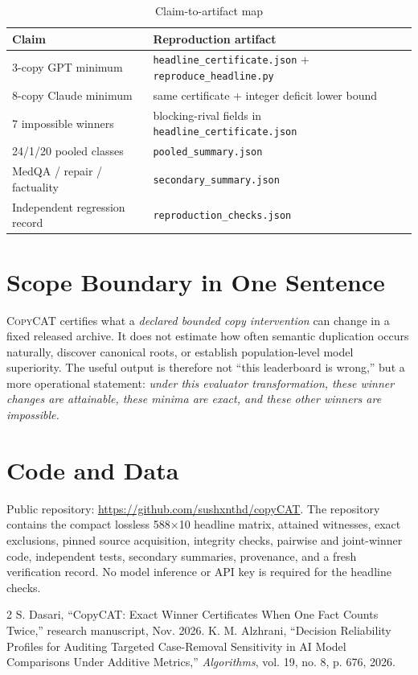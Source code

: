 \documentclass[conference]{IEEEtran}
\newcommand{\copycat}{\textsc{CopyCAT}}
\begin{document}
\begin{table}[H]
\caption{Claim-to-artifact map}
\label{tab:map}
\centering
\footnotesize
\begin{tabular}{p{}p{}}
\toprule
Claim & Reproduction artifact \\
\midrule
3-copy GPT minimum & \texttt{headline\_certificate.json} + \texttt{reproduce\_headline.py} \\
8-copy Claude minimum & same certificate + integer deficit lower bound \\
7 impossible winners & blocking-rival fields in \texttt{headline\_certificate.json} \\
24/1/20 pooled classes & \texttt{pooled\_summary.json} \\
MedQA / repair / factuality & \texttt{secondary\_summary.json} \\
Independent regression record & \texttt{reproduction\_checks.json} \\
\bottomrule
\end{tabular}
\end{table}

\section{Scope Boundary in One Sentence}
\copycat{} certifies what a \emph{declared bounded copy intervention} can change in a fixed released archive. It does not estimate how often semantic duplication occurs naturally, discover canonical roots, or establish population-level model superiority. The useful output is therefore not ``this leaderboard is wrong,'' but a more operational statement: \emph{under this evaluator transformation, these winner changes are attainable, these minima are exact, and these other winners are impossible.}

\section*{Code and Data}
Public repository: \url{https://github.com/sushxnthd/copyCAT}. The repository contains the compact lossless 588$\times$10 headline matrix, attained witnesses, exact exclusions, pinned source acquisition, integrity checks, pairwise and joint-winner code, independent tests, secondary summaries, provenance, and a fresh verification record. No model inference or API key is required for the headline checks.

{\scriptsize
\begin{thebibliography}{2}
 S. Dasari, ``CopyCAT: Exact Winner Certificates When One Fact Counts Twice,'' research manuscript, Nov. 2026.
 K. M. Alzhrani, ``Decision Reliability Profiles for Auditing Targeted Case-Removal Sensitivity in AI Model Comparisons Under Additive Metrics,'' \emph{Algorithms}, vol. 19, no. 8, p. 676, 2026.
\end{thebibliography}
}
\end{document}
